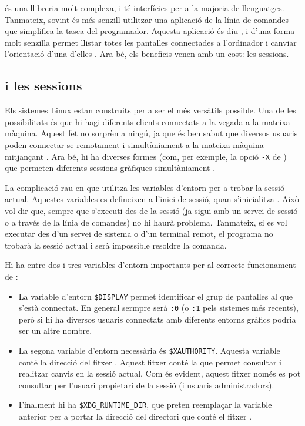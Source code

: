  és una llibreria molt complexa, i té interfícies per a la majoria
de llenguatges. Tanmateix, sovint és més senzill utilitzar una aplicació de
la línia de comandes que simplifica la tasca del programador. Aquesta
aplicació és diu , i d'una forma molt senzilla permet llistar
totes les pantalles connectades a l'ordinador i canviar l'orientació
d'una d'elles \cite{Xrandr}. Ara bé, els beneficis venen amb un cost: les sessions.

\subsection{ i les sessions}
\label{subsec:xrandr}

Els sistemes Linux estan construits per a ser el més versàtils possible. Una
de les possibilitats és que hi hagi diferents clients connectats a la vegada
a la mateixa màquina. Aquest fet no sorprèn a ningú, ja que és ben sabut que
diversos usuaris poden connectar-se remotament i simultàniament a la mateixa
màquina mitjançant . Ara bé, hi ha diverses formes (com, per exemple,
la opció \verb|-X| de ) que permeten diferents sessions gràfiques
simultàniament \cite{ManSSH}.

La complicació rau en que  utilitza les variables d'entorn per a
trobar la sessió actual. Aquestes variables es defineixen a l'inici de sessió,
quan s'inicialitza . Això vol dir que, sempre que s'executi
 des de la sessió (ja sigui amb un servei de sessió o a través de
la línia de comandes) no hi haurà problema.
Tanmateix, si es vol executar  des d'un servei de sistema o d'un
terminal remot, el programa no trobarà la sessió actual i serà impossible
resoldre la comanda.

Hi ha entre dos i tres variables d'entorn importants per al correcte funcionament
de  \cite{XrandrVars}:

\begin{itemize}
    \item La variable d'entorn \verb|$DISPLAY| permet identificar el grup de
    pantalles al que s'està connectat. En general sermpre serà \verb|:0| (o 
    \verb|:1| pels sistemes més recents), però si hi ha diversos usuaris
    connectats amb diferents entorns gràfics podria ser un altre nombre.
    \item La segona variable d'entorn necessària és \verb|$XAUTHORITY|. Aquesta
    variable conté la direcció del fitxer . Aquest fitxer
    conté la  que permet consultar i realitzar canvis en la sessió
    actual. Com és evident, aquest fitxer només es pot consultar per l'usuari
    propietari de la sessió (i usuaris administradors).
    \item Finalment hi ha \verb|$XDG_RUNTIME_DIR|, que preten reemplaçar la
    variable anterior per a portar la direcció del directori que conté el fitxer
    .
\end{itemize}

